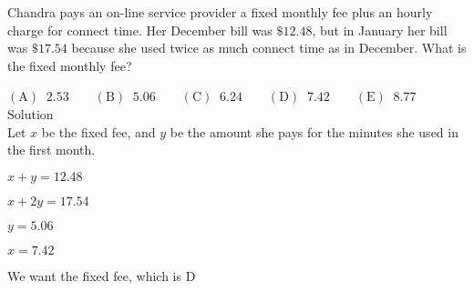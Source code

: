 
Chandra pays an on-line service provider a fixed monthly fee plus an hourly charge for connect time. Her December bill was $\$12.48$, but in January her bill was $\$17.54$ because she used twice as much connect time as in December. What is the fixed monthly fee?

$\mathrm{(A)}\ $ $2.53 \qquad\mathrm{(B)}\ $ $5.06 \qquad\mathrm{(C)}\ $ $6.24 \qquad\mathrm{(D)}\ $ $7.42 \qquad\mathrm{(E)}\ $ $8.77$
\\
Solution
\\
Let $x$ be the fixed fee, and $y$ be the amount she pays for the minutes she used in the first month.

$x+y=12.48$

$x+2y=17.54$

$y=5.06$

$x=7.42$

We want the fixed fee, which is $\boxed{\text{D}}$
